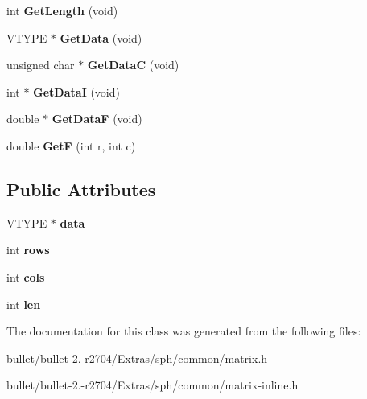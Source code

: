 \begin{DoxyCompactItemize}
\item 
\hypertarget{class_matrix_c_a6d8fb774c541c5741741a07a23047e77}{int {\bfseries Get\+Length} (void)}\label{class_matrix_c_a6d8fb774c541c5741741a07a23047e77}

\item 
\hypertarget{class_matrix_c_a488c62c3377dcc222ef06ad3e121e7e3}{V\+T\+Y\+P\+E $\ast$ {\bfseries Get\+Data} (void)}\label{class_matrix_c_a488c62c3377dcc222ef06ad3e121e7e3}

\item 
\hypertarget{class_matrix_c_aa6b07f144819e2d73e97463475d34b80}{unsigned char $\ast$ {\bfseries Get\+Data\+C} (void)}\label{class_matrix_c_aa6b07f144819e2d73e97463475d34b80}

\item 
\hypertarget{class_matrix_c_a5bc14485bd35330c9f3b76ce5440733b}{int $\ast$ {\bfseries Get\+Data\+I} (void)}\label{class_matrix_c_a5bc14485bd35330c9f3b76ce5440733b}

\item 
\hypertarget{class_matrix_c_ad4ce533a4e59cc76edad2f8934875d4d}{double $\ast$ {\bfseries Get\+Data\+F} (void)}\label{class_matrix_c_ad4ce533a4e59cc76edad2f8934875d4d}

\item 
\hypertarget{class_matrix_c_ade2530aa2f84d340856ed8f2c009b30d}{double {\bfseries Get\+F} (int r, int c)}\label{class_matrix_c_ade2530aa2f84d340856ed8f2c009b30d}

\end{DoxyCompactItemize}
\subsection*{Public Attributes}
\begin{DoxyCompactItemize}
\item 
\hypertarget{class_matrix_c_ab7db6bbdc4db25c87f263a98d1d302f7}{V\+T\+Y\+P\+E $\ast$ {\bfseries data}}\label{class_matrix_c_ab7db6bbdc4db25c87f263a98d1d302f7}

\item 
\hypertarget{class_matrix_c_a855729eb9a8e81b654d348df8e7106ba}{int {\bfseries rows}}\label{class_matrix_c_a855729eb9a8e81b654d348df8e7106ba}

\item 
\hypertarget{class_matrix_c_a8e8020a024afb4a96c338bc03acd7081}{int {\bfseries cols}}\label{class_matrix_c_a8e8020a024afb4a96c338bc03acd7081}

\item 
\hypertarget{class_matrix_c_a2a56c587a52fb4caf26a0d0e34a25dad}{int {\bfseries len}}\label{class_matrix_c_a2a56c587a52fb4caf26a0d0e34a25dad}

\end{DoxyCompactItemize}


The documentation for this class was generated from the following files\+:\begin{DoxyCompactItemize}
\item 
bullet/bullet-\/2.-\/r2704/\+Extras/sph/common/matrix.\+h\item 
bullet/bullet-\/2.-\/r2704/\+Extras/sph/common/matrix-\/inline.\+h\end{DoxyCompactItemize}
